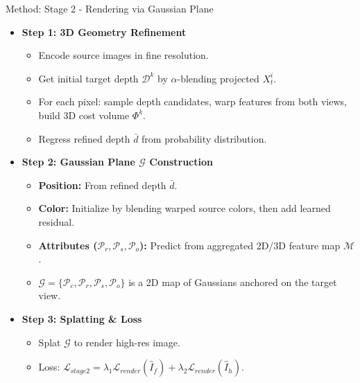 \begin{frame}{Method: Stage 2 - Rendering via Gaussian Plane}
    \begin{itemize}
        \item \textbf{Step 1: 3D Geometry Refinement}
        \begin{itemize}
            \item Encode source images in fine resolution.
            \item Get initial target depth $\mathcal{D}^k$ by $\alpha$-blending projected $X_t^i$.
            \item For each pixel: sample depth candidates, warp features from both views, build 3D cost volume $\Phi^k$.
            \item Regress refined depth $\bar{d}$ from probability distribution.
        \end{itemize}
        \item \textbf{Step 2: Gaussian Plane $\mathcal{G}$ Construction}
        \begin{itemize}
            \item \textbf{Position:} From refined depth $\bar{d}$.
            \item \textbf{Color:} Initialize by blending warped source colors, then add learned residual.
            \item \textbf{Attributes ($\mathcal{P}_r, \mathcal{P}_s, \mathcal{P}_o$):} Predict from aggregated 2D/3D feature map $\mathcal{M}$.
            \item $\mathcal{G} = \{\mathcal{P}_c, \mathcal{P}_r, \mathcal{P}_s, \mathcal{P}_o\}$ is a 2D map of Gaussians anchored on the target view.
        \end{itemize}
        \item \textbf{Step 3: Splatting \& Loss}
        \begin{itemize}
            \item Splat $\mathcal{G}$ to render high-res image.
            \item Loss: $\mathcal{L}_{stage2} = \lambda_1 \mathcal{L}_{render}(\hat{I}_f) + \lambda_2 \mathcal{L}_{render}(\hat{I}_h)$.
        \end{itemize}
    \end{itemize}
\end{frame}

